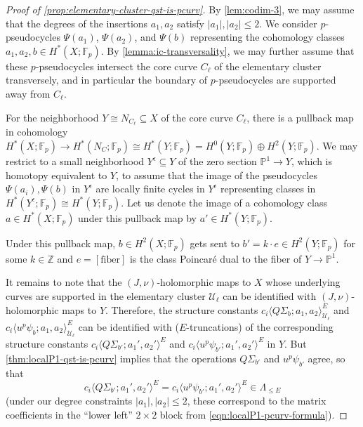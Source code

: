 \documentclass[reqno]{amsart}
\numberwithin{equation}{section}
\numberwithin{equation}{section}
\numberwithin{equation}{section}
\theoremstyle{definition}
\theoremstyle{remark}
\theoremstyle{remark}
\begin{document}
\begin{proof}[Proof of \cref{prop:elementary-cluster-qst-is-pcurv}]
    By \cref{lem:codim-3}, we may assume that the degrees of the insertions $a_1, a_2$ satisfy $|a_1|, |a_2| \le 2$. We consider $p$-pseudocycles $\Psi(a_1)$, $\Psi(a_2)$, and $\Psi(b)$ representing the cohomology classes $a_1, a_2, b \in H^*(X;\mathbb{F}_p)$. By \cref{lemma:ic-transversality}, we may further assume that these $p$-pseudocycles intersect the core curve $C_\ell$ of the elementary cluster transversely, and in particular the boundary of $p$-pseudocycles are supported away from $C_\ell$.

    For the neighborhood $Y \cong N_{C_\ell} \subseteq X$ of the core curve $C_\ell$, there is a  pullback map in cohomology $H^*(X;\mathbb{F}_p) \to H^*(N_C;\mathbb{F}_p) \cong H^*(Y;\mathbb{F}_p) = H^0(Y;\mathbb{F}_p) \oplus H^2(Y;\mathbb{F}_p)$. We may restrict to a small neighborhood $Y^\epsilon \subseteq Y$ of the zero section $\mathbb{P}^1 \to Y$, which is homotopy equivalent to $Y$, to assume that the image of the pseudocycles $\Psi(a_i), \Psi(b)$ in $Y^\epsilon$ are locally finite cycles in $Y^\epsilon$ representing classes in $H^*(Y^\epsilon;\mathbb{F}_p) \cong H^*(Y;\mathbb{F}_p)$. Let us denote the image of a cohomology class $a \in H^*(X;\mathbb{F}_p)$ under this pullback map by $a' \in H^*(Y;\mathbb{F}_p)$.
    
    Under this pullback map, $b \in H^2(X;\mathbb{F}_p)$ gets sent to $b' = k \cdot e \in H^2(Y;\mathbb{F}_p)$ for some $k \in \mathbb{Z}$ and $e = [\mathrm{fiber}]$ is the class Poincar\'e dual to the fiber of $Y \to \mathbb{P}^1$. 

    It remains to note that the $(J,\nu)$-holomorphic maps to $X$ whose underlying curves are supported in the elementary cluster $\mathcal{U}_\ell$ can be identified with $(J, \nu)$-holomorphic maps to $Y$. Therefore, the structure constants $c_i \langle Q\Sigma_b; a_1, a_2 \rangle^E_{\mathcal{U}_\ell}$ and $c_i \langle u^p \psi_b; a_1, a_2 \rangle^E_{\mathcal{U}_\ell}$ can be identified with ($E$-truncations) of the corresponding structure constants $c_i\langle Q\Sigma_{b'}; a_1', a_2' \rangle^E$ and $c_i\langle u^p  \psi_{b'}; a_1', a_2' \rangle^E$ in $Y$. But \cref{thm:localP1-qst-is-pcurv} implies that the operations $Q\Sigma_{b'}$ and $u^p \psi_{b'}$ agree, so that 
    \begin{equation}
        c_i\langle Q\Sigma_{b'}; a_1', a_2' \rangle^E = c_i\langle u^p \psi_{b'}; a_1', a_2' \rangle^E \in \Lambda_{\le E}
    \end{equation}
    (under our degree constraints $|a_1|, |a_2| \le 2$, these correspond to the matrix coefficients in the ``lower left'' $2 \times 2$ block from \cref{eqn:localP1-pcurv-formula}). 
\end{proof}
    
\end{document}
